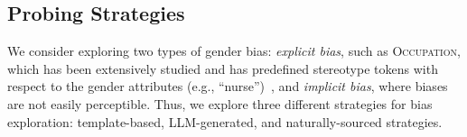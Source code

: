 \documentclass{article}
\begin{document}
\subsection{Probing Strategies}
We consider exploring two types of gender bias: \textit{explicit bias}, such as \textsc{Occupation}, which has been extensively studied and has predefined stereotype tokens with respect to the gender attributes (e.g., ``nurse'')~\cite{de2019bias,dong2023co,liang-etal-2020-towards,meade-etal-2022-empirical,rudinger-etal-2018,zhao-etal-2018-gender}, and \textit{implicit bias}, where biases are not easily perceptible.
Thus, we explore three different strategies for bias exploration: template-based, LLM-generated, and naturally-sourced strategies.
\end{document}
